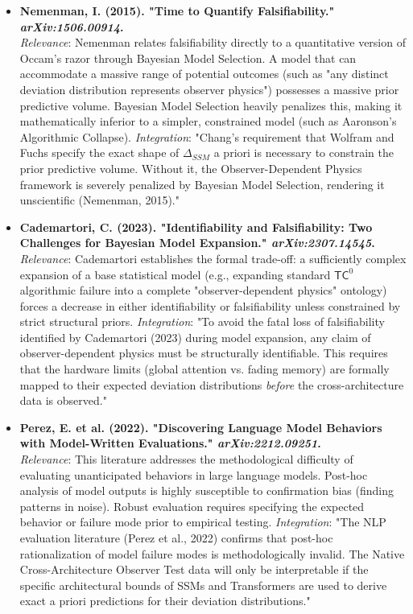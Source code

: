 \documentclass[12pt]{article}
\begin{document}
\begin{itemize}
    \item \textbf{Nemenman, I. (2015). "Time to Quantify Falsifiability." \textit{arXiv:1506.00914}.} \\
    \textit{Relevance}: Nemenman relates falsifiability directly to a quantitative version of Occam's razor through Bayesian Model Selection. A model that can accommodate a massive range of potential outcomes (such as "any distinct deviation distribution represents observer physics") possesses a massive prior predictive volume. Bayesian Model Selection heavily penalizes this, making it mathematically inferior to a simpler, constrained model (such as Aaronson's Algorithmic Collapse).
    \textit{Integration}: "Chang's requirement that Wolfram and Fuchs specify the exact shape of $\Delta_{SSM}$ a priori is necessary to constrain the prior predictive volume. Without it, the Observer-Dependent Physics framework is severely penalized by Bayesian Model Selection, rendering it unscientific (Nemenman, 2015)."

    \item \textbf{Cademartori, C. (2023). "Identifiability and Falsifiability: Two Challenges for Bayesian Model Expansion." \textit{arXiv:2307.14545}.} \\
    \textit{Relevance}: Cademartori establishes the formal trade-off: a sufficiently complex expansion of a base statistical model (e.g., expanding standard $\mathsf{TC}^0$ algorithmic failure into a complete "observer-dependent physics" ontology) forces a decrease in either identifiability or falsifiability unless constrained by strict structural priors.
    \textit{Integration}: "To avoid the fatal loss of falsifiability identified by Cademartori (2023) during model expansion, any claim of observer-dependent physics must be structurally identifiable. This requires that the hardware limits (global attention vs. fading memory) are formally mapped to their expected deviation distributions \textit{before} the cross-architecture data is observed."

    \item \textbf{Perez, E. et al. (2022). "Discovering Language Model Behaviors with Model-Written Evaluations." \textit{arXiv:2212.09251}.} \\
    \textit{Relevance}: This literature addresses the methodological difficulty of evaluating unanticipated behaviors in large language models. Post-hoc analysis of model outputs is highly susceptible to confirmation bias (finding patterns in noise). Robust evaluation requires specifying the expected behavior or failure mode prior to empirical testing.
    \textit{Integration}: "The NLP evaluation literature (Perez et al., 2022) confirms that post-hoc rationalization of model failure modes is methodologically invalid. The Native Cross-Architecture Observer Test data will only be interpretable if the specific architectural bounds of SSMs and Transformers are used to derive exact a priori predictions for their deviation distributions."
\end{itemize}
\end{document}
